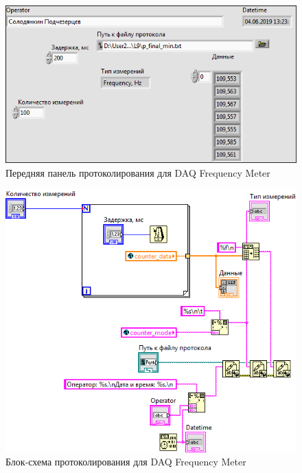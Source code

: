 \documentclass[a4paper,14pt]{article}
\begin{document}
\begin{figure}[H]
	\centering
	\includegraphics[width=\linewidth]{image/dfm_scaner_vi}
	\caption{Передняя панель протоколирования для DAQ Frequency Meter}\label{img:dfm_scaner_vi}
\end{figure}

\begin{figure}[H]
	\centering
	\includegraphics[width=\linewidth]{image/dfm_scanner_schema}
	\caption{Блок-схема протоколирования для DAQ Frequency Meter}\label{img:dfm_scanner_schema}
\end{figure}
\end{document}
